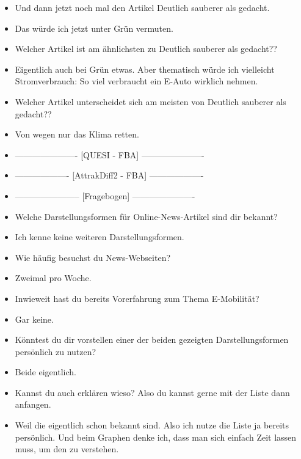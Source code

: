 {\begin{itemize}[]
        \item {} Und dann jetzt noch mal den Artikel \flqq Deutlich sauberer als gedacht\frqq{}.
        \item {} Das würde ich jetzt unter Grün vermuten.
        \item {} Welcher Artikel ist am ähnlichsten zu \flqq Deutlich sauberer als gedacht?\frqq{}?
        \item {} Eigentlich auch bei Grün etwas.
              Aber thematisch würde ich vielleicht \flqq Stromverbrauch: So viel verbraucht ein E-Auto wirklich\frqq{} nehmen.
        \item {} Welcher Artikel unterscheidet sich am meisten von \flqq Deutlich sauberer als gedacht?\frqq{}?
        \item {} \flqq Von wegen nur das Klima retten\frqq{}.
        \item {----------------------} [QUESI - FBA] {----------------------}
        \item {-------------------} [AttrakDiff2 - FBA] {-------------------}
        \item {-----------------------} [Fragebogen] {----------------------}
        \item {} Welche Darstellungsformen für Online-News-Artikel sind dir bekannt?
        \item {} Ich kenne keine weiteren Darstellungsformen.
        \item {} Wie häufig besuchst du News-Webseiten?
        \item {} Zweimal pro Woche.
        \item {} Inwieweit hast du bereits Vorerfahrung zum Thema E-Mobilität?
        \item {} Gar keine.
        \item {} Könntest du dir vorstellen einer der beiden gezeigten Darstellungsformen persönlich zu nutzen?
        \item {} Beide eigentlich.
        \item {} Kannst du auch erklären wieso? Also du kannst gerne mit der Liste dann anfangen.
        \item {} Weil die eigentlich schon bekannt sind.
              Also ich nutze die Liste ja bereits persönlich.
              Und beim Graphen denke ich, dass man sich einfach Zeit lassen muss, um den zu verstehen.

\end{itemize}}
